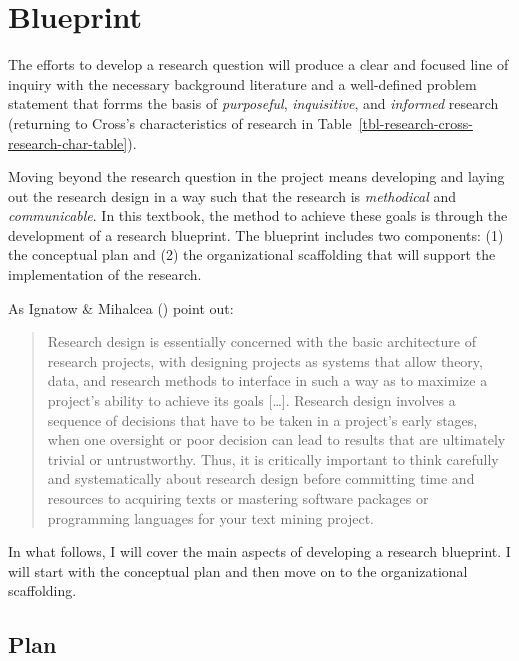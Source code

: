 \documentclass[
  letterpaper,
]{latex/krantz}
\theoremstyle{definition}
\theoremstyle{remark}
\begin{document}
\section{Blueprint}\label{sec-research-blueprint}

The efforts to develop a research question will produce a clear and
focused line of inquiry with the necessary background literature and a
well-defined problem statement that forrms the basis of
\emph{purposeful}, \emph{inquisitive}, and \emph{informed} research
(returning to Cross's characteristics of research in
Table~\ref{tbl-research-cross-research-char-table}).

Moving beyond the research question in the project means developing and
laying out the research design in a way such that the research is
\emph{methodical} and \emph{communicable}. In this textbook, the method
to achieve these goals is through the development of a research
blueprint. The blueprint includes two components: (1) the conceptual
plan and (2) the organizational scaffolding that will support the
implementation of the research.

As Ignatow \& Mihalcea () point out:

\begin{quote}
Research design is essentially concerned with the basic architecture of
research projects, with designing projects as systems that allow theory,
data, and research methods to interface in such a way as to maximize a
project's ability to achieve its goals {[}\ldots{]}. Research design
involves a sequence of decisions that have to be taken in a project's
early stages, when one oversight or poor decision can lead to results
that are ultimately trivial or untrustworthy. Thus, it is critically
important to think carefully and systematically about research design
before committing time and resources to acquiring texts or mastering
software packages or programming languages for your text mining project.
\end{quote}

In what follows, I will cover the main aspects of developing a research
blueprint. I will start with the conceptual plan and then move on to the
organizational scaffolding.

\subsection{Plan}\label{sec-research-plan}
\end{document}
